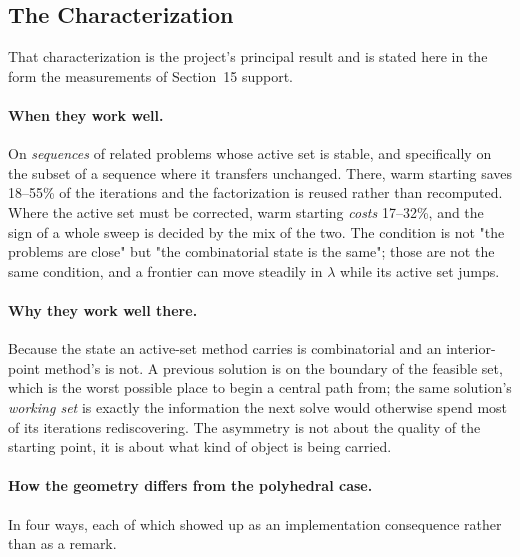 \documentclass[11pt,a4paper]{article}
\begin{document}
\subsection{The Characterization}

That characterization is the project's principal result and is stated
here in the form the measurements of Section~15 support.

\paragraph{When they work well.} On \emph{sequences} of related
problems whose active set is stable, and specifically on the subset of
a sequence where it transfers unchanged. There, warm starting saves
18--55\% of the iterations and the factorization is reused rather than
recomputed. Where the active set must be corrected, warm starting
\emph{costs} 17--32\%, and the sign of a whole sweep is decided by the
mix of the two. The condition is not "the problems are close" but "the
combinatorial state is the same"; those are not the same condition,
and a frontier can move steadily in $\lambda$ while its active set
jumps.

\paragraph{Why they work well there.} Because the state an active-set
method carries is combinatorial and an interior-point method's is not.
A previous solution is on the boundary of the feasible set, which is
the worst possible place to begin a central path from; the same
solution's \emph{working set} is exactly the information the next
solve would otherwise spend most of its iterations rediscovering. The
asymmetry is not about the quality of the starting point, it is about
what kind of object is being carried.

\paragraph{How the geometry differs from the polyhedral case.} In four
ways, each of which showed up as an implementation consequence rather
than as a remark.
\end{document}
